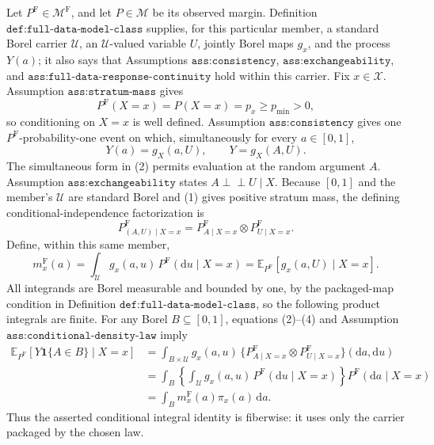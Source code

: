 Let \(P^{\mathrm F}\in\mathcal M^{\mathrm F}\), and let \(P\in\mathcal M\) be its observed margin.  Definition \(\texttt{def:full-data-model-class}\) supplies, for this particular member, a standard Borel carrier \(\mathcal U\), an \(\mathcal U\)-valued variable \(U\), jointly Borel maps \(g_x\), and the process \(Y(a)\); it also says that Assumptions \(\texttt{ass:consistency}\), \(\texttt{ass:exchangeability}\), and \(\texttt{ass:full-data-response-continuity}\) hold within this carrier.  Fix \(x\in\mathcal X\).  Assumption \(\texttt{ass:stratum-mass}\) gives
\[
 P^{\mathrm F}(X=x)=P(X=x)=p_x\geq p_{\min}>0,
 \tag{1}
\]
so conditioning on \(X=x\) is well defined.  Assumption \(\texttt{ass:consistency}\) gives one \(P^{\mathrm F}\)-probability-one event on which, simultaneously for every \(a\in[0,1]\),
\[
 Y(a)=g_X(a,U),
 \qquad
 Y=g_X(A,U).
 \tag{2}
\]
The simultaneous form in (2) permits evaluation at the random argument \(A\).  Assumption \(\texttt{ass:exchangeability}\) states \(A\perp\!\!\!\perp U\mid X\).  Because \([0,1]\) and the member's \(\mathcal U\) are standard Borel and (1) gives positive stratum mass, the defining conditional-independence factorization is
\[
 P^{\mathrm F}_{(A,U)\mid X=x}
 =P^{\mathrm F}_{A\mid X=x}\otimes P^{\mathrm F}_{U\mid X=x}.
 \tag{3}
\]
Define, within this same member,
\[
 m_x^{\mathrm F}(a)
 =\int_{\mathcal U}g_x(a,u)\,P^{\mathrm F}(\mathrm du\mid X=x)
 =\mathbb E_{P^{\mathrm F}}[g_x(a,U)\mid X=x].
 \tag{4}
\]
All integrands are Borel measurable and bounded by one, by the packaged-map condition in Definition \(\texttt{def:full-data-model-class}\), so the following product integrals are finite.  For any Borel \(B\subseteq[0,1]\), equations (2)--(4) and Assumption \(\texttt{ass:conditional-density-law}\) imply
\[
\begin{aligned}
 \mathbb E_{P^{\mathrm F}}[Y\mathbf 1\{A\in B\}\mid X=x]
 &=\int_{B\times\mathcal U}g_x(a,u)\,
   \{P^{\mathrm F}_{A\mid X=x}\otimes P^{\mathrm F}_{U\mid X=x}\}
   (\mathrm da,\mathrm du)\\
 &=\int_B\left\{\int_{\mathcal U}g_x(a,u)\,
   P^{\mathrm F}(\mathrm du\mid X=x)\right\}
   P^{\mathrm F}(\mathrm da\mid X=x)\\
 &=\int_Bm_x^{\mathrm F}(a)\pi_x(a)\,\mathrm da.
\end{aligned}
\tag{5}
\]
Thus the asserted conditional integral identity is fiberwise: it uses only the carrier packaged by the chosen law.

